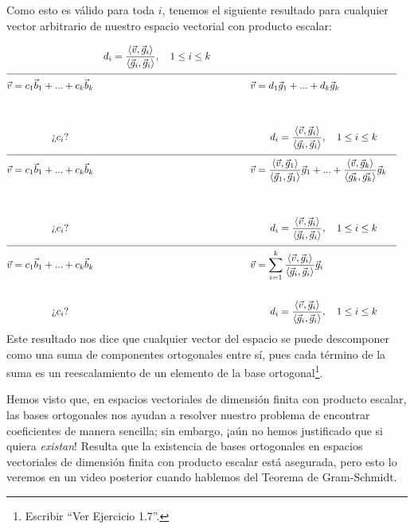 \documentclass[12pt,dvipsnames]{article}
\numberwithin{equation}{section}
\begin{document}
Como esto es válido para toda $i$, tenemos el siguiente resultado para cualquier vector arbitrario de nuestro espacio vectorial con producto escalar:

\begin{align*}
    & &d_i = \frac{\langle \vec{v} ,\vec{g}_i \rangle}{\langle\vec{g}_i, \vec{g}_i\rangle}, \quad 1\le i\le k
    \\
    \cline{1-8}
    \vec{v}&= c_1\vec{b}_1 + ... + c_k\vec{b}_k& &\quad \quad \quad \quad \vec{v}= d_1\vec{g}_1 + ... + d_k\vec{g}_k& & & \\
    \\
    \\
           &\quad \quad \quad \quad \text{¿}c_i\text{?}& &\quad \quad \quad \quad \quad \quad d_i = \frac{\langle \vec{v} ,\vec{g}_i \rangle}{\langle\vec{g}_i, \vec{g}_i\rangle}, \quad 1\le i\le k& & &
    \\
    \cline{1-8}
    \vec{v}&= c_1\vec{b}_1 + ... + c_k\vec{b}_k& &\quad \quad \quad \quad \vec{v}= \frac{\langle \vec{v} , \vec{g}_1 \rangle}{\langle \vec{g}_1 , \vec{g}_1 \rangle}\vec{g}_1 + ... + \frac{\langle \vec{v} , \vec{g}_k \rangle}{\langle \vec{g_k} , \vec{g_k} \rangle}\vec{g}_k& & & \\
    \\
    \\
           &\quad \quad \quad \quad \text{¿}c_i\text{?}& &\quad \quad \quad \quad \quad \quad d_i = \frac{\langle \vec{v} ,\vec{g}_i \rangle}{\langle\vec{g}_i, \vec{g}_i\rangle}, \quad 1\le i\le k& & &
    \\
    \cline{1-8}
    \vec{v}&= c_1\vec{b}_1 + ... + c_k\vec{b}_k& &\quad \quad \quad \quad \vec{v}= \sum_{i=1}^k\frac{\langle \vec{v} , \vec{g}_i \rangle}{\langle \vec{g}_i , \vec{g}_i \rangle}\vec{g}_i & & &
    \\
    \\
           &\quad \quad \quad \quad \text{¿}c_i\text{?}& &\quad \quad \quad \quad \quad \quad d_i = \frac{\langle \vec{v} ,\vec{g}_i \rangle}{\langle\vec{g}_i, \vec{g}_i\rangle}, \quad 1\le i\le k& & &
\end{align*}
Este resultado nos dice que cualquier vector del espacio se puede descomponer como una suma de componentes ortogonales entre sí, pues cada término de la suma es un reescalamiento de un elemento de la base ortogonal\footnote{Escribir ``Ver Ejercicio 1.7''.}.

Hemos visto que, en espacios vectoriales de dimensión finita con producto escalar, las bases ortogonales nos ayudan a resolver nuestro problema de encontrar coeficientes de manera sencilla; sin embargo, ¡aún no hemos justificado que si quiera \emph{existan}! Resulta que la existencia de bases ortogonales en espacios vectoriales de dimensión finita con producto escalar está asegurada, pero esto lo veremos en un video posterior cuando hablemos del Teorema de Gram-Schmidt.
\end{document}
